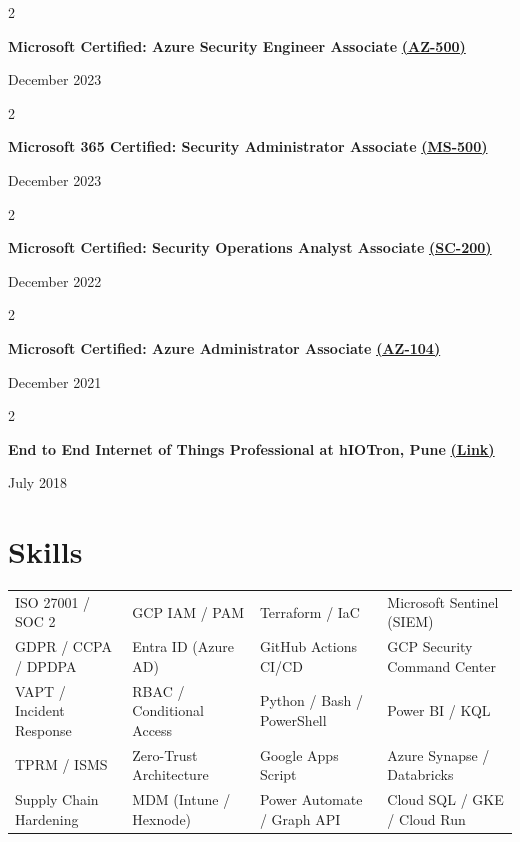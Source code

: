 \documentclass[10pt, letterpaper]{article}
\newenvironment{twocolentry}[2][]{
    \onecolentry
    \def\secondColumn{#2}
    \setcolumnwidth{\fill, 4.5 cm}
    \begin{paracol}{2}
}{
    \switchcolumn \raggedleft \secondColumn
    \end{paracol}
    \endonecolentry
}
\begin{document}
\vspace{0.05 cm}
\begin{twocolentry}{December 2023}
    \textbf{Microsoft Certified: Azure Security Engineer Associate} \href{https://learn.microsoft.com/en-us/users/ChinmayDhokMAQSoftware-5822/credentials/AB3913F87040CE9}{\textbf{(AZ-500)}}
\end{twocolentry}

\vspace{0.05 cm}
\begin{twocolentry}{December 2023}
    \textbf{Microsoft 365 Certified: Security Administrator Associate} \href{https://learn.microsoft.com/en-us/users/chinmaydhokmaqsoftware-5822/credentials/c0ae1a2902b51750}{\textbf{(MS-500)}}
\end{twocolentry}

\vspace{0.05 cm}
\begin{twocolentry}{December 2022}
    \textbf{Microsoft Certified: Security Operations Analyst Associate} \href{https://learn.microsoft.com/en-us/users/ChinmayDhokMAQSoftware-5822/credentials/E22E4108C28D9FF2}{\textbf{(SC-200)}}
\end{twocolentry}

\vspace{0.05 cm}
\begin{twocolentry}{December 2021}
    \textbf{Microsoft Certified: Azure Administrator Associate} \href{https://learn.microsoft.com/en-us/users/chinmaydhokmaqsoftware-5822/credentials/ccf1857230b93a53}{\textbf{(AZ-104)}}
\end{twocolentry}

\vspace{0.05 cm}
\begin{twocolentry}{July 2018}
    \textbf{End to End Internet of Things Professional at hIOTron, Pune} \href{https://drive.google.com/file/d/1TszTWmW1DkZhw1jVyjv3x0MUVGfYMrgD/view?usp=sharing}{\textbf{(Link)}}
\end{twocolentry}


\section*{Skills}

\vspace{0.2cm}

\noindent\begin{tabularx}{\textwidth}{@{}XXXX@{}}
ISO 27001 / SOC 2         & GCP IAM / PAM              & Terraform / IaC            & Microsoft Sentinel (SIEM) \\
GDPR / CCPA / DPDPA       & Entra ID (Azure AD)        & GitHub Actions CI/CD       & GCP Security Command Center \\
VAPT / Incident Response  & RBAC / Conditional Access   & Python / Bash / PowerShell & Power BI / KQL \\
TPRM / ISMS               & Zero-Trust Architecture     & Google Apps Script         & Azure Synapse / Databricks \\
Supply Chain Hardening    & MDM (Intune / Hexnode)      & Power Automate / Graph API & Cloud SQL / GKE / Cloud Run \\
\end{tabularx}
\end{document}
